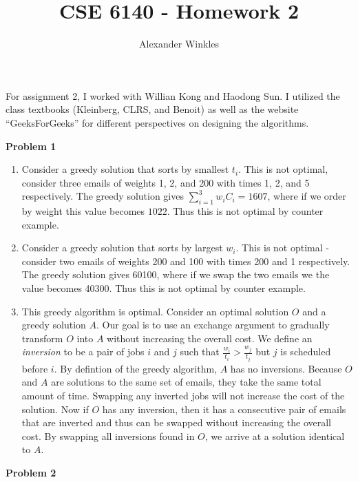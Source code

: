 \documentclass{article}
\title{CSE 6140 - Homework 2}
\author{Alexander Winkles}
\date{}
\newcommand{\Problem}[1]{\textbf{Problem #1}}
\begin{document}
\maketitle

\vspace{2in}

For assignment 2, I worked with Willian Kong and Haodong Sun.
I utilized the class textbooks (Kleinberg, CLRS, and Benoit) as well as the website ``GeeksForGeeks'' for different perspectives on designing the algorithms.

\newpage

\Problem{1}

\begin{enumerate}

\item Consider a greedy solution that sorts by smallest $t_i$. 
This is not optimal, consider three emails of weights 1, 2, and 200 with times 1, 2, and 5 respectively. 
The greedy solution gives $\sum_{i=1}^3w_iC_i = 1607$, where if we order by weight this value becomes $1022$. 
Thus this is not optimal by counter example.

\item Consider a greedy solution that sorts by largest $w_i$.
This is not optimal - consider two emails of weights 200 and 100 with times 200 and 1 respectively.
The greedy solution gives 60100, where if we swap the two emails we the value becomes 40300.
Thus this is not optimal by counter example.

\item This greedy algorithm is optimal. 
Consider an optimal solution $O$ and a greedy solution $A$. 
Our goal is to use an exchange argument to gradually transform $O$ into $A$ without increasing the overall cost.
We define an \textit{inversion} to be a pair of jobs $i$ and $j$ such that $\frac{w_i}{t_i} > \frac{w_j}{t_j}$ but $j$ is scheduled before $i$.
By defintion of the greedy algorithm, $A$ has no inversions. 
Because $O$ and $A$ are solutions to the same set of emails, they take the same total amount of time. 
Swapping any inverted jobs will not increase the cost of the solution. 
Now if $O$ has any inversion, then it has a consecutive pair of emails that are inverted and thus can be swapped without increasing the overall cost. 
By swapping all inversions found in $O$, we arrive at a solution identical to $A$.

\end{enumerate}

\Problem{2}
\end{document}
